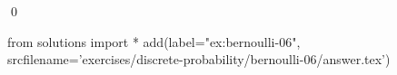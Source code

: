 
\begin{ex} 
  \label{ex:bernoulli-06}
  
  \qed
\end{ex} 
\begin{python0}
from solutions import *
add(label="ex:bernoulli-06",
    srcfilename='exercises/discrete-probability/bernoulli-06/answer.tex') 
\end{python0}
